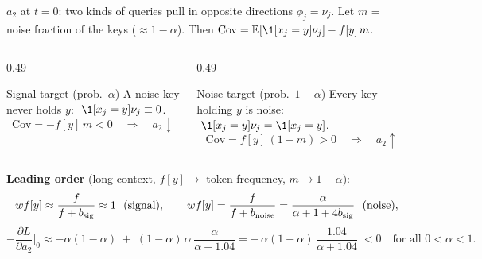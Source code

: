 \begin{frame}{$a_2$ at $t=0$: two kinds of queries pull in opposite directions}
\small
$\phi_j=\nu_j$. Let $m$ = noise fraction of the keys ($\approx1-\alpha$). Then $\mathrm{Cov}=\mathbb E[\1[x_j=y]\nu_j]-f[y]\,m$.
\begin{columns}[T]
\begin{column}{0.49\textwidth}
\begin{block}{Signal target (prob.\ $\alpha$)}
A noise key never holds $y$: $\ \1[x_j=y]\nu_j\equiv0$.
\[
\mathrm{Cov}=-f[y]\,m<0\quad\Rightarrow\quad a_2\downarrow
\]
\end{block}
\end{column}
\begin{column}{0.49\textwidth}
\begin{block}{Noise target (prob.\ $1-\alpha$)}
Every key holding $y$ is noise: $\ \1[x_j=y]\nu_j=\1[x_j=y]$.
\[
\mathrm{Cov}=f[y]\,(1-m)>0\quad\Rightarrow\quad a_2\uparrow
\]
\end{block}
\end{column}
\end{columns}
\vspace{0.4em}
\textbf{Leading order} (long context, $f[y]\to$ token frequency, $m\to1-\alpha$):
\[
w f[y]\approx\frac{f}{f+b_{\rm sig}}\approx1\ \ \text{(signal)},\qquad
w f[y]=\frac{f}{f+b_{\rm noise}}=\frac{\alpha}{\alpha+1+4b_{\rm sig}}\ \ \text{(noise)},
\]
\[
-\frac{\partial L}{\partial a_2}\Big|_0\approx-\alpha(1-\alpha)\;+\;(1-\alpha)\,\alpha\,\frac{\alpha}{\alpha+1.04}
=-\,\alpha(1-\alpha)\,\frac{1.04}{\alpha+1.04}\;<0\quad\text{for all }0<\alpha<1.
\]
\end{frame}

